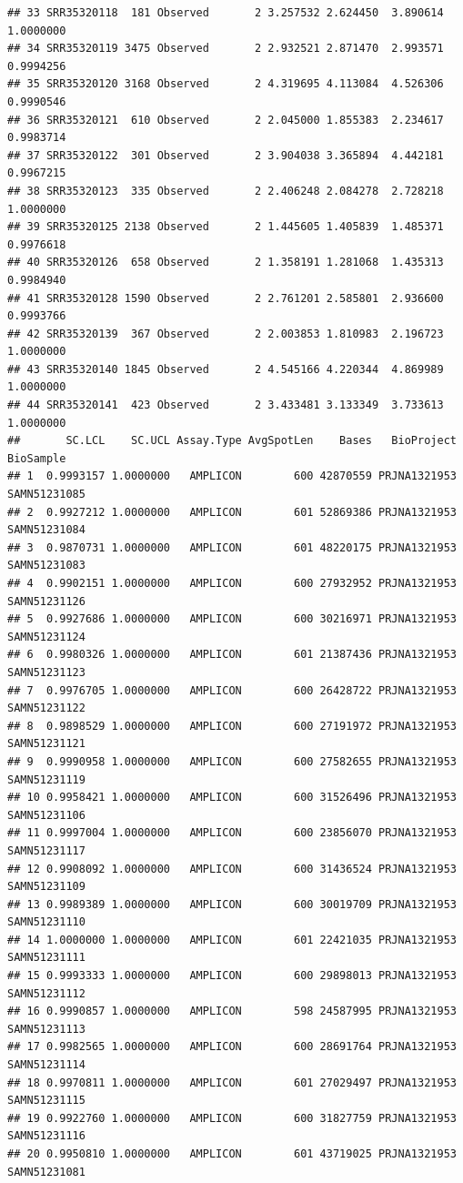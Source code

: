 \documentclass[
]{article}
\begin{document}
\begin{verbatim}
## 33 SRR35320118  181 Observed       2 3.257532 2.624450  3.890614 1.0000000
## 34 SRR35320119 3475 Observed       2 2.932521 2.871470  2.993571 0.9994256
## 35 SRR35320120 3168 Observed       2 4.319695 4.113084  4.526306 0.9990546
## 36 SRR35320121  610 Observed       2 2.045000 1.855383  2.234617 0.9983714
## 37 SRR35320122  301 Observed       2 3.904038 3.365894  4.442181 0.9967215
## 38 SRR35320123  335 Observed       2 2.406248 2.084278  2.728218 1.0000000
## 39 SRR35320125 2138 Observed       2 1.445605 1.405839  1.485371 0.9976618
## 40 SRR35320126  658 Observed       2 1.358191 1.281068  1.435313 0.9984940
## 41 SRR35320128 1590 Observed       2 2.761201 2.585801  2.936600 0.9993766
## 42 SRR35320139  367 Observed       2 2.003853 1.810983  2.196723 1.0000000
## 43 SRR35320140 1845 Observed       2 4.545166 4.220344  4.869989 1.0000000
## 44 SRR35320141  423 Observed       2 3.433481 3.133349  3.733613 1.0000000
##       SC.LCL    SC.UCL Assay.Type AvgSpotLen    Bases   BioProject    BioSample
## 1  0.9993157 1.0000000   AMPLICON        600 42870559 PRJNA1321953 SAMN51231085
## 2  0.9927212 1.0000000   AMPLICON        601 52869386 PRJNA1321953 SAMN51231084
## 3  0.9870731 1.0000000   AMPLICON        601 48220175 PRJNA1321953 SAMN51231083
## 4  0.9902151 1.0000000   AMPLICON        600 27932952 PRJNA1321953 SAMN51231126
## 5  0.9927686 1.0000000   AMPLICON        600 30216971 PRJNA1321953 SAMN51231124
## 6  0.9980326 1.0000000   AMPLICON        601 21387436 PRJNA1321953 SAMN51231123
## 7  0.9976705 1.0000000   AMPLICON        600 26428722 PRJNA1321953 SAMN51231122
## 8  0.9898529 1.0000000   AMPLICON        600 27191972 PRJNA1321953 SAMN51231121
## 9  0.9990958 1.0000000   AMPLICON        600 27582655 PRJNA1321953 SAMN51231119
## 10 0.9958421 1.0000000   AMPLICON        600 31526496 PRJNA1321953 SAMN51231106
## 11 0.9997004 1.0000000   AMPLICON        600 23856070 PRJNA1321953 SAMN51231117
## 12 0.9908092 1.0000000   AMPLICON        600 31436524 PRJNA1321953 SAMN51231109
## 13 0.9989389 1.0000000   AMPLICON        600 30019709 PRJNA1321953 SAMN51231110
## 14 1.0000000 1.0000000   AMPLICON        601 22421035 PRJNA1321953 SAMN51231111
## 15 0.9993333 1.0000000   AMPLICON        600 29898013 PRJNA1321953 SAMN51231112
## 16 0.9990857 1.0000000   AMPLICON        598 24587995 PRJNA1321953 SAMN51231113
## 17 0.9982565 1.0000000   AMPLICON        600 28691764 PRJNA1321953 SAMN51231114
## 18 0.9970811 1.0000000   AMPLICON        601 27029497 PRJNA1321953 SAMN51231115
## 19 0.9922760 1.0000000   AMPLICON        600 31827759 PRJNA1321953 SAMN51231116
## 20 0.9950810 1.0000000   AMPLICON        601 43719025 PRJNA1321953 SAMN51231081

\end{verbatim}
\end{document}
